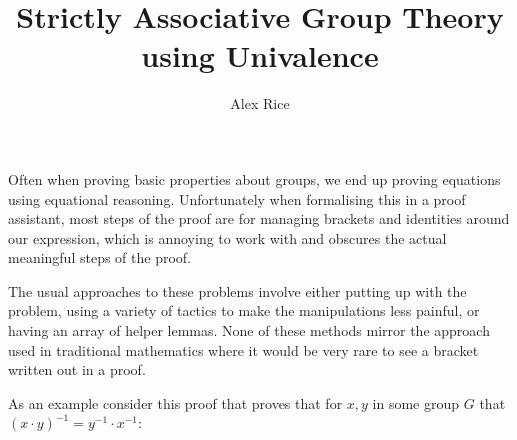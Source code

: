 \documentclass{article}
\title{Strictly Associative Group Theory using Univalence}
\author{Alex Rice}
\begin{document}
\maketitle

Often when proving basic properties about groups, we end up proving equations using equational reasoning. Unfortunately when formalising this in a proof assistant, most steps of the proof are for managing brackets and identities around our expression, which is annoying to work with and obscures the actual meaningful steps of the proof.

The usual approaches to these problems involve either putting up with the problem, using a variety of tactics to make the manipulations less painful, or having an array of helper lemmas. None of these methods mirror the approach used in traditional mathematics where it would be very rare to see a bracket written out in a proof.

As an example consider this proof that proves that for \(x,y\) in some group \(G\) that \((x \cdot y)^{-1} = y^{-1} \cdot x^{-1}\):

\begin{code}[hide]%
\>[0]\AgdaSpace{}%
\AgdaSpace{}%
\<%
\\
\>[0]\AgdaSpace{}%
\AgdaSpace{}%
\<%
\\
\>[0]\AgdaSpace{}%
\AgdaSpace{}%
\<%
\\
\>[0]\AgdaSpace{}%
\AgdaSpace{}%
\<%
\\
\>[0]\AgdaSpace{}%
\AgdaSpace{}%
\<%
\\
\>[0]\AgdaSpace{}%
\AgdaSpace{}%
\<%
\end{code}
\end{document}
